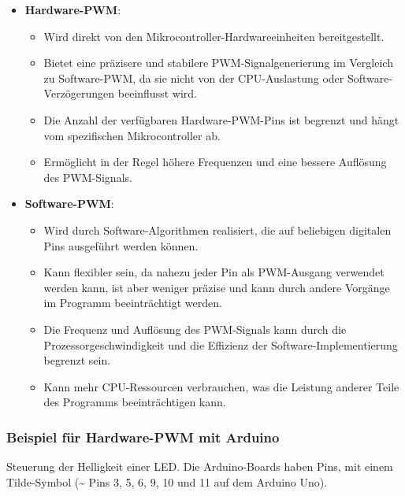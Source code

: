 \documentclass{vorlage-design-main}
\begin{document}
\begin{itemize}

\item
  \textbf{Hardware-PWM}:

  \begin{itemize}
  
  \item
    Wird direkt von den Mikrocontroller-Hardwareeinheiten
    bereitgestellt.
  \item
    Bietet eine präzisere und stabilere PWM-Signalgenerierung im
    Vergleich zu Software-PWM, da sie nicht von der CPU-Auslastung oder
    Software-Verzögerungen beeinflusst wird.
  \item
    Die Anzahl der verfügbaren Hardware-PWM-Pins ist begrenzt und hängt
    vom spezifischen Mikrocontroller ab.
  \item
    Ermöglicht in der Regel höhere Frequenzen und eine bessere Auflösung
    des PWM-Signals.
  \end{itemize}
\item
  \textbf{Software-PWM}:

  \begin{itemize}
  
  \item
    Wird durch Software-Algorithmen realisiert, die auf beliebigen
    digitalen Pins ausgeführt werden können.
  \item
    Kann flexibler sein, da nahezu jeder Pin als PWM-Ausgang verwendet
    werden kann, ist aber weniger präzise und kann durch andere Vorgänge
    im Programm beeinträchtigt werden.
  \item
    Die Frequenz und Auflösung des PWM-Signals kann durch die
    Prozessorgeschwindigkeit und die Effizienz der
    Software-Implementierung begrenzt sein.
  \item
    Kann mehr CPU-Ressourcen verbrauchen, was die Leistung anderer Teile
    des Programms beeinträchtigen kann.
  \end{itemize}
\end{itemize}

\hypertarget{beispiel-fuxfcr-hardware-pwm-mit-arduino}{%
\subsubsection{Beispiel für Hardware-PWM mit
Arduino}\label{beispiel-fuer-hardware-pwm-mit-arduino}}

Steuerung der Helligkeit einer LED. Die Arduino-Boards haben Pins, mit
einem Tilde-Symbol (\textasciitilde{} Pins 3, 5, 6, 9, 10 und 11 auf dem
Arduino Uno).
\end{document}
